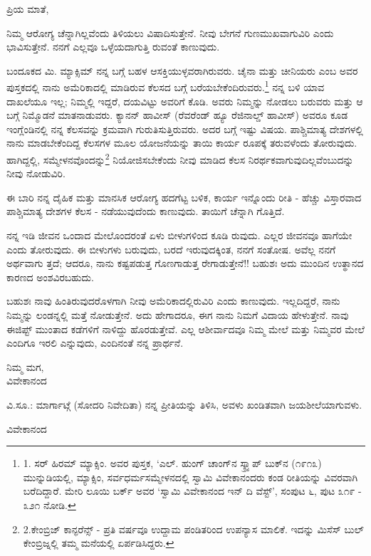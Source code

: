 ಪ್ರಿಯ ಮಾತೆ,

ನಿಮ್ಮ ಆರೋಗ್ಯ ಚೆನ್ನಾಗಿಲ್ಲವೆಂದು ತಿಳಿಯಲು ವಿಷಾದಿಸುತ್ತೇನೆ. ನೀವು ಬೇಗನೆ ಗುಣಮುಖವಾಗುವಿರಿ ಎಂದು ಭಾವಿಸುತ್ತೇನೆ. ನನಗೆ ಎಲ್ಲವೂ ಒಳ್ಳೆಯದಾಗುತ್ತಿ ರುವಂತೆ ಕಾಣುವುದು.

ಬಂದೂಕದ ಮಿ. ಮ್ಯಾಕ್ಸಿಮ್​ ನನ್ನ ಬಗ್ಗೆ ಬಹಳ ಆಸಕ್ತಿಯುಳ್ಳವರಾಗಿರುವರು. ಚೈನಾ ಮತ್ತು ಚೀನಿಯರು ಎಂಬ ಅವರ ಪುಸ್ತಕದಲ್ಲಿ ನಾನು ಅಮೆರಿಕಾದಲ್ಲಿ ಮಾಡಿರುವ ಕೆಲಸದ ಬಗ್ಗೆ ಬರೆಯಬೇಕೆಂದಿರುವರು.\footnote{1. ಸರ್ ಹಿರಮ್​ ಮ್ಯಾಕ್ಸಿಂ. ಅವರ ಪುಸ್ತಕ, ‘ಎಲ್. ಹುಂಗ್ ಚಾಂಗ್​ನ ಸ್ಕ್ರ್ಯಾಪ್ ಬುಕ್​ನ (೧೯೧೩) ಮುನ್ನುಡಿಯಲ್ಲಿ, ಮ್ಯಾಕ್ಸಿಂ, ಸರ್ವಧರ್ಮಸಮ್ಮೇಳನದಲ್ಲಿ ಸ್ವಾಮಿ ವಿವೇಕಾನಂದರು ಕಂಡ ರೀತಿಯನ್ನು ವಿವರವಾಗಿ ಬರೆದಿದ್ದಾರೆ. ಮೇರಿ ಲೂಯಿ ಬರ್ಕ್ ಅವರ ‘ಸ್ವಾಮಿ ವಿವೇಕಾನಂದ ಇನ್ ದಿ ವೆಸ್ಟ್’, ಸಂಪುಟ ೬, ಪುಟ ೩೧೯ - ೩೨೧ ನೋಡಿ.} ನನ್ನ ಬಳಿ ಯಾವ ದಾಖಲೆಯೂ ಇಲ್ಲ; ನಿಮ್ಮಲ್ಲಿ ಇದ್ದರೆ, ದಯವಿಟ್ಟು ಅವರಿಗೆ ಕೊಡಿ. ಅವರು ನಿಮ್ಮನ್ನು ನೋಡಲು ಬರುವರು ಮತ್ತು ಆ ಬಗ್ಗೆ ನಿಮ್ಮೊಡನೆ ಮಾತನಾಡುವರು. ಕ್ಯಾನನ್ ಹಾವೀಸ್ (ರೆವರೆಂಡ್ ಹ್ಯೂ ರೆಜಿನಾಲ್ಡ್ ಹಾವೀಸ್) ಅವರೂ ಕೂಡ ಇಂಗ್ಲೆಂಡಿನಲ್ಲಿ ನನ್ನ ಕೆಲಸವನ್ನು ಕ್ರಮವಾಗಿ ಗುರುತಿಸುತ್ತಿರುವರು. ಅದರ ಬಗ್ಗೆ ಇಷ್ಟು ವಿಷಯ. ಪಾಶ್ಚಿಮಾತ್ಯ ದೇಶಗಳಲ್ಲಿ ನಾನು ಮಾಡಬೇಕೆಂದಿದ್ದ ಕೆಲಸಗಳ ಮೂಲ ಯೋಜನೆಯನ್ನು ತಾಯಿ ಕಾರ್ಯ ರೂಪಕ್ಕೆ ತರುವಳೆಂದು ತೋರುವುದು. ಹಾಗಿದ್ದಲ್ಲಿ, ಸಮ್ಮೇಳನವೊಂದನ್ನು\footnote{2.ಕೇಂಬ್ರಿಜ್ ಕಾನ್ಫರೆನ್ಸ್ - ಪ್ರತಿ ವರ್ಷವೂ ಉದ್ದಾಮ ಪಂಡಿತರಿಂದ ಉಪನ್ಯಾಸ ಮಾಲಿಕೆ. ಇದನ್ನು ಮಿಸೆಸ್ ಬುಲ್ ಕೇಂಬ್ರಿಜ್ನಲ್ಲಿ ತಮ್ಮ ಮನೆಯಲ್ಲಿ ಏರ್ಪಡಿಸಿದ್ದರು.} ನಿಯೋಜಿಸಬೇಕೆಂದು ನೀವು ಮಾಡಿದ ಕೆಲಸ ನಿರರ್ಥಕವಾಗುವುದಿಲ್ಲವೆಂಬುದನ್ನು ನೀವು ನೋಡುವಿರಿ.

ಈ ಬಾರಿ ನನ್ನ ದೈಹಿಕ ಮತ್ತು ಮಾನಸಿಕ ಆರೋಗ್ಯ ಹದಗೆಟ್ಟ ಬಳಿಕ, ಕಾರ್ಯ ಇನ್ನೊಂದು ರೀತಿ - ಹೆಚ್ಚು ವಿಸ್ತಾರವಾದ ಪಾಶ್ಚಿಮಾತ್ಯ ದೇಶಗಳ ಕೆಲಸ - ನಡೆಯುವುದೆಂದು ಕಾಣುವುದು. ತಾಯಿಗೆ ಚೆನ್ನಾಗಿ ಗೊತ್ತಿದೆ.

ನನ್ನ ಇಡಿ ಜೀವನ ಒಂದಾದ ಮೇಲೊಂದರಂತೆ ಏಳು ಬೀಳುಗಳಿಂದ ಕೂಡಿ ರುವುದು. ಎಲ್ಲರ ಜೀವನವೂ ಹಾಗೆಯೇ ಎಂದು ತೋರುವುದು. ಈ ಬೀಳುಗಳು ಬರುವುದು, ಬರದೆ ಇರುವುದಕ್ಕಿಂತ, ನನಗೆ ಸಂತೋಷ. ಅವೆಲ್ಲ ನನಗೆ ಅರ್ಥವಾಗು ತ್ತದೆ; ಆದರೂ, ನಾನು ಕಷ್ಟಪಡುತ್ತ ಗೊಣಗಾಡುತ್ತ ರೇಗಾಡುತ್ತೇನೆ!! ಬಹುಶಃ ಅದು ಮುಂದಿನ ಉತ್ಥಾನದ ಕಾರಣದ ಅಂಶವಿರಬಹುದು.

ಬಹುಶಃ ನಾವು ಹಿಂತಿರುವುದರೊಳಗಾಗಿ ನೀವು ಅಮೆರಿಕಾದಲ್ಲಿರುವಿರಿ ಎಂದು ಕಾಣುವುದು. ಇಲ್ಲದಿದ್ದರೆ, ನಾನು ನಿಮ್ಮನ್ನು ಲಂಡನ್ನಲ್ಲಿ ಮತ್ತೆ ನೋಡುತ್ತೇನೆ. ಅದು ಹೇಗಾದರೂ, ಈಗ ನಾನು ನಿಮಗೆ ವಿದಾಯ ಹೇಳುತ್ತೇನೆ. ನಾವು ಈಜಿಪ್ಟ್ ಮುಂತಾದ ಕಡೆಗಳಿಗೆ ನಾಳಿದ್ದು ಹೊರಡುತ್ತೇವೆ. ಎಲ್ಲ ಆಶೀರ್ವಾದವೂ ನಿಮ್ಮ ಮೇಲೆ ಮತ್ತು ನಿಮ್ಮವರ ಮೇಲೆ ಎಂದಿಗೂ ಇರಲಿ ಎನ್ನುವುದು, ಎಂದಿನಂತೆ ನನ್ನ ಪ್ರಾರ್ಥನೆ.

\begin{flushright}
ನಿಮ್ಮ ಮಗ,\\ವಿವೇಕಾನಂದ
\end{flushright}

ವಿ.ಸೂ.: ಮಾರ್ಗಾಟ್ಗೆ (ಸೋದರಿ ನಿವೇದಿತಾ) ನನ್ನ ಪ್ರೀತಿಯನ್ನು ತಿಳಿಸಿ, ಅವಳು ಖಂಡಿತವಾಗಿ ಜಯಶೀಲೆಯಾಗುವಳು.

\begin{flushright}
ವಿವೇಕಾನಂದ
\end{flushright}

